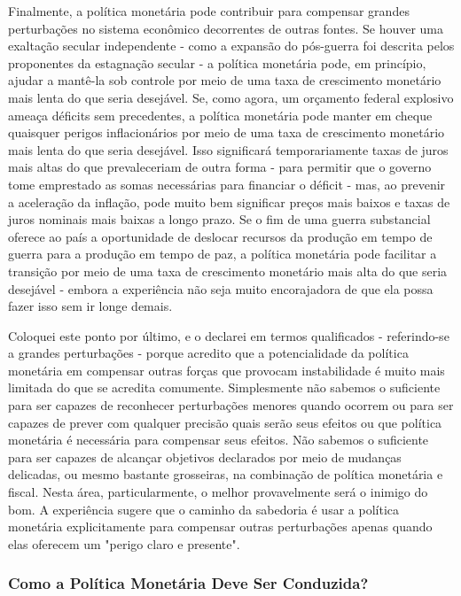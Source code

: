 \documentclass[12pt]{article}
\begin{document}
Finalmente, a política monetária pode contribuir para compensar grandes perturbações no sistema econômico decorrentes de outras fontes. Se houver uma exaltação secular independente - como a expansão do pós-guerra foi descrita pelos proponentes da estagnação secular - a política monetária pode, em princípio, ajudar a mantê-la sob controle por meio de uma taxa de crescimento monetário mais lenta do que seria desejável. Se, como agora, um orçamento federal explosivo ameaça déficits sem precedentes, a política monetária pode manter em cheque quaisquer perigos inflacionários por meio de uma taxa de crescimento monetário mais lenta do que seria desejável. Isso significará temporariamente taxas de juros mais altas do que prevaleceriam de outra forma - para permitir que o governo tome emprestado as somas necessárias para financiar o déficit - mas, ao prevenir a aceleração da inflação, pode muito bem significar preços mais baixos e taxas de juros nominais mais baixas a longo prazo. Se o fim de uma guerra substancial oferece ao país a oportunidade de deslocar recursos da produção em tempo de guerra para a produção em tempo de paz, a política monetária pode facilitar a transição por meio de uma taxa de crescimento monetário mais alta do que seria desejável - embora a experiência não seja muito encorajadora de que ela possa fazer isso sem ir longe demais.

Coloquei este ponto por último, e o declarei em termos qualificados - referindo-se a grandes perturbações - porque acredito que a potencialidade da política monetária em compensar outras forças que provocam instabilidade é muito mais limitada do que se acredita comumente. Simplesmente não sabemos o suficiente para ser capazes de reconhecer perturbações menores quando ocorrem ou para ser capazes de prever com qualquer precisão quais serão seus efeitos ou que política monetária é necessária para compensar seus efeitos. Não sabemos o suficiente para ser capazes de alcançar objetivos declarados por meio de mudanças delicadas, ou mesmo bastante grosseiras, na combinação de política monetária e fiscal. Nesta área, particularmente, o melhor provavelmente será o inimigo do bom. A experiência sugere que o caminho da sabedoria é usar a política monetária explicitamente para compensar outras perturbações apenas quando elas oferecem um "perigo claro e presente".

\subsubsection{\textbf{Como a Política Monetária Deve Ser Conduzida?}}
\end{document}
